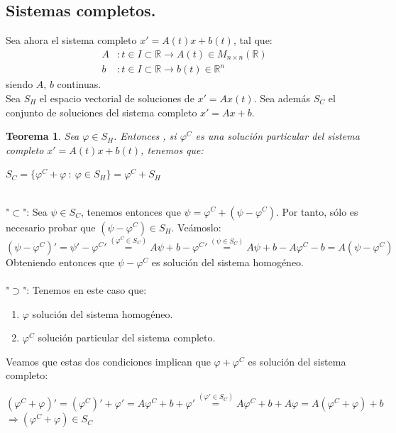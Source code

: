 \documentclass[11pt, a4paper,twoside]{article}
\makeatletter
\theoremstyle{theorem-style}  %
\newtheorem{theorem}{Teorema}[section]  %
\renewenvironment{proof}[1][\proofname]{\par
	\pushQED{\qed}%
	\normalfont \topsep6\p@\@plus6\p@\relax
	\list{}{%
		\settowidth{\leftmargin}{\quad:\hskip\labelsep}%
		\setlength{\labelwidth}{0pt}%
		\setlength{\itemindent}{-\leftmargin}%
	}%
	\item[\hskip\labelsep\itshape#1\@addpunct{:}]\ignorespaces
}{%
	\popQED\endlist\@endpefalse
}
\theoremstyle{definition-style}
\theoremstyle{example-style}
\makeatother
\begin{document}
\subsection{Sistemas completos.}
Sea ahora el sistema completo $x' = A(t)x + b(t)$, tal que:
\begin{align*}
	A &: t \in I \subset \mathbb{R} \longrightarrow A(t) \in M_{n \times n} (\mathbb{R}) \\
	b &: t \in I \subset \mathbb{R} \longrightarrow b(t) \in \mathbb{R}^n
\end{align*}
siendo $A$, $b$ continuas.\\
Sea $S_H$ el espacio vectorial de soluciones de $x' = Ax(t)$. Sea además $S_C$ el conjunto de soluciones del sistema completo $x' = Ax + b$.
\begin{theorem}
	Sea $\varphi \in S_H$. Entonces , si $ \varphi^C $ es una solución particular del sistema completo $  x' = A(t)x + b(t) $, tenemos que:
	\begin{center}
		$S_C = \{ \varphi^C + \varphi \ : \ \varphi \in S_H  \} = \varphi^C + S_H$
	\end{center}
\end{theorem}
\begin{proof}\ \\ 
	"$\subset$": Sea $\psi \in S_C$, tenemos entonces que $\psi = \varphi^C + (\psi - \varphi^C)$. Por tanto, sólo es necesario probar que $(\psi - \varphi^C) \in S_H$. Veámoslo: 
	\[ (\psi - \varphi^C )' = \psi' - \varphi^C{'} \stackrel{(\varphi^C \in S_C)}{=} A \psi + b - \varphi^C{'} \stackrel{(\psi \in S_C)}{=} A\psi + b - A \varphi^C - b = A (\psi - \varphi^C) \]
	Obteniendo entonces que $\psi - \varphi^C$ es solución del sistema homogéneo.\\ \\
	"$\supset$": Tenemos en este caso que:
	\begin{enumerate}
		\item $\varphi$ solución del sistema homogéneo.
		\item $\varphi^C$ solución particular del sistema completo.
	\end{enumerate}
	Veamos que estas dos condiciones implican que $\varphi + \varphi^C$ es solución del sistema completo:
	\begin{center}
		$(\varphi^C + \varphi)' = (\varphi^C)' + \varphi' = A\varphi^C + b + \varphi' \stackrel{(\varphi' \in S_C)}{=} A\varphi^C + b + A\varphi =
		A(\varphi^C + \varphi) + b$ \\
		$ \Rightarrow (\varphi^C + \varphi) \in S_C$
	\end{center}
\end{proof}
\end{document}
